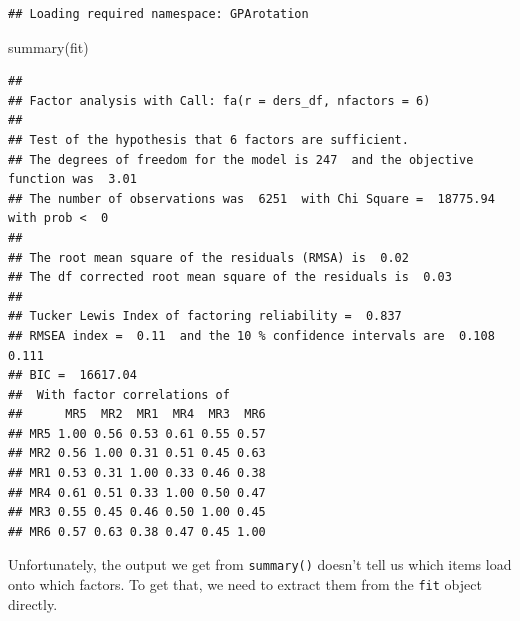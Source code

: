 \documentclass[
]{book}
\newenvironment{Shaded}{\begin{snugshade}}{\end{snugshade}}
\newcommand{\FunctionTok}[1]{\textcolor[rgb]{0.00,0.00,0.00}{#1}}
\newcommand{\NormalTok}[1]{#1}
\newcommand{\SpecialCharTok}[1]{\textcolor[rgb]{0.00,0.00,0.00}{#1}}
\begin{document}
\begin{verbatim}
## Loading required namespace: GPArotation
\end{verbatim}

\begin{Shaded}
\begin{Highlighting}[]
\FunctionTok{summary}\NormalTok{(fit)}
\end{Highlighting}
\end{Shaded}

\begin{verbatim}
## 
## Factor analysis with Call: fa(r = ders_df, nfactors = 6)
## 
## Test of the hypothesis that 6 factors are sufficient.
## The degrees of freedom for the model is 247  and the objective function was  3.01 
## The number of observations was  6251  with Chi Square =  18775.94  with prob <  0 
## 
## The root mean square of the residuals (RMSA) is  0.02 
## The df corrected root mean square of the residuals is  0.03 
## 
## Tucker Lewis Index of factoring reliability =  0.837
## RMSEA index =  0.11  and the 10 % confidence intervals are  0.108 0.111
## BIC =  16617.04
##  With factor correlations of 
##      MR5  MR2  MR1  MR4  MR3  MR6
## MR5 1.00 0.56 0.53 0.61 0.55 0.57
## MR2 0.56 1.00 0.31 0.51 0.45 0.63
## MR1 0.53 0.31 1.00 0.33 0.46 0.38
## MR4 0.61 0.51 0.33 1.00 0.50 0.47
## MR3 0.55 0.45 0.46 0.50 1.00 0.45
## MR6 0.57 0.63 0.38 0.47 0.45 1.00
\end{verbatim}

Unfortunately, the output we get from \texttt{summary()} doesn't tell us which items load onto which factors. To get that, we need to extract them from the \texttt{fit} object directly.

\begin{Shaded}
\end{Shaded}
\end{document}
